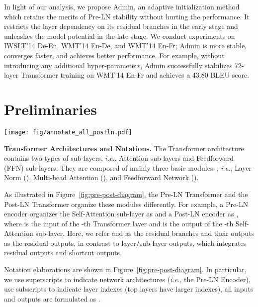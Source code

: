 \documentclass[11pt,a4paper]{article}
\newcommand{\our}{\mbox{Admin}\xspace}
\newcommand{\ie}{\textit{i.e.}}
\newcommand{\smallsection}[1]{{\vspace{0.2cm}\noindent\textbf{#1.}}}
\begin{document}
In light of our analysis, we propose \our, an adaptive initialization method which retains the merits of Pre-LN stability without hurting the performance.
It restricts the layer dependency on its residual branches in the early stage and unleashes the model potential in the late stage.
We conduct experiments on IWSLT'14 De-En,  WMT'14 En-De, and WMT'14 En-Fr;
\our is more stable, converges faster, and achieves better performance. 
For example, without introducing any additional hyper-parameters, \our successfully stabilizes 72-layer Transformer training on WMT'14 En-Fr and achieves a 43.80 BLEU score.
 

\section{Preliminaries}

\begin{figure*}[t]
\centering
\texttt{[image: fig/annotate\_all\_postln.pdf]}
\caption{Relative gradient norm histogram (on a log scale) of 18-layer Transformers on the WMT'14 En-De dataset, \ie, the gradient norm of sub-layer outputs, scaled by the largest gradient norm in the same network. 
}
\label{fig:gradient-histogram}
\end{figure*}

\smallsection{Transformer Architectures and Notations}
\label{subsec:architecture}
The Transformer architecture contains two types of sub-layers, \ie, Attention sub-layers and Feedforward (FFN) sub-layers. 
They are composed of mainly three basic modules~\cite{Vaswani2017AttentionIA}, \ie, Layer Norm (), Multi-head Attention (), and Feedforward Network ().

As illustrated in Figure~\ref{fig:pre-post-diagram}, the Pre-LN Transformer and the Post-LN Transformer organize these modules differently. 
For example, a Pre-LN encoder organizes the Self-Attention sub-layer as  and a Post-LN encoder as , where  is the input of the -th Transformer layer and  is the output of the -th Self-Attention sub-layer.
Here, we refer   and  as the residual branches and their outputs as the residual outputs, in contrast to layer/sub-layer outputs, which integrates residual outputs and shortcut outputs. 


Notation elaborations are shown in Figure~\ref{fig:pre-post-diagram}.
In particular, we use superscripts to indicate network architectures (\ie, the Pre-LN Encoder), use subscripts to indicate layer indexes (top layers have larger indexes), all inputs and outputs are formulated as .  
\end{document}

